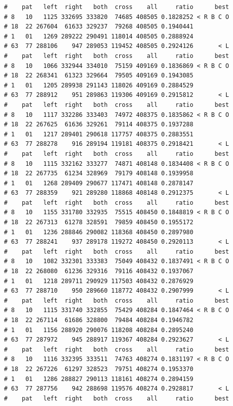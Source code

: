 \documentclass{article}\usepackage[]{graphicx}\usepackage[]{color}
\makeatletter
\newenvironment{kframe}{%
 \def\at@end@of@kframe{}%
 \ifinner\ifhmode%
  \def\at@end@of@kframe{\end{minipage}}%
  \begin{minipage}{\columnwidth}%
 \fi\fi%
 \def\FrameCommand##1{\hskip\@totalleftmargin \hskip-\fboxsep
 \colorbox{shadecolor}{##1}\hskip-\fboxsep
     \hskip-\linewidth \hskip-\@totalleftmargin \hskip\columnwidth}%
 \MakeFramed {\advance\hsize-\width
   \@totalleftmargin\z@ \linewidth\hsize
   \@setminipage}}%
 {\par\unskip\endMakeFramed%
 \at@end@of@kframe}
\newenvironment{knitrout}{}{} %
\makeatother
\begin{document}
\begin{knitrout}
\begin{kframe}
\begin{verbatim}
#    pat   left  right   both  cross    all     ratio      best
# 8   10   1125 332695 333820  74685 408505 0.1828252 < R B C O
# 18  22 267604  61633 329237  79268 408505 0.1940441          
# 1   01   1269 289222 290491 118014 408505 0.2888924          
# 63  77 288106    947 289053 119452 408505 0.2924126       < L
#    pat   left  right   both  cross    all     ratio      best
# 8   10   1066 332944 334010  75159 409169 0.1836869 < R B C O
# 18  22 268341  61323 329664  79505 409169 0.1943085          
# 1   01   1205 289938 291143 118026 409169 0.2884529          
# 63  77 288912    951 289863 119306 409169 0.2915812       < L
#    pat   left  right   both  cross    all     ratio      best
# 8   10   1117 332286 333403  74972 408375 0.1835862 < R B C O
# 18  22 267625  61636 329261  79114 408375 0.1937288          
# 1   01   1217 289401 290618 117757 408375 0.2883551          
# 63  77 288278    916 289194 119181 408375 0.2918421       < L
#    pat   left  right   both  cross    all     ratio      best
# 8   10   1115 332162 333277  74871 408148 0.1834408 < R B C O
# 18  22 267735  61234 328969  79179 408148 0.1939958          
# 1   01   1268 289409 290677 117471 408148 0.2878147          
# 63  77 288359    921 289280 118868 408148 0.2912375       < L
#    pat   left  right   both  cross    all     ratio      best
# 8   10   1155 331780 332935  75515 408450 0.1848819 < R B C O
# 18  22 267313  61278 328591  79859 408450 0.1955172          
# 1   01   1236 288846 290082 118368 408450 0.2897980          
# 63  77 288241    937 289178 119272 408450 0.2920113       < L
#    pat   left  right   both  cross    all     ratio      best
# 8   10   1082 332301 333383  75049 408432 0.1837491 < R B C O
# 18  22 268080  61236 329316  79116 408432 0.1937067          
# 1   01   1218 289711 290929 117503 408432 0.2876929          
# 63  77 288710    950 289660 118772 408432 0.2907999       < L
#    pat   left  right   both  cross    all     ratio      best
# 8   10   1115 331740 332855  75429 408284 0.1847464 < R B C O
# 18  22 267114  61686 328800  79484 408284 0.1946782          
# 1   01   1156 288920 290076 118208 408284 0.2895240          
# 63  77 287972    945 288917 119367 408284 0.2923627       < L
#    pat   left  right   both  cross    all     ratio      best
# 8   10   1116 332395 333511  74763 408274 0.1831197 < R B C O
# 18  22 267226  61297 328523  79751 408274 0.1953370          
# 1   01   1286 288827 290113 118161 408274 0.2894159          
# 63  77 287756    942 288698 119576 408274 0.2928817       < L
#    pat   left  right   both  cross    all     ratio      best

\end{verbatim}
\end{kframe}
\end{knitrout}
\end{document}
